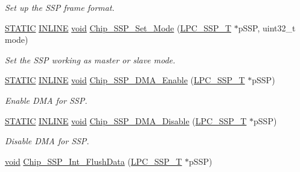 \begin{DoxyCompactItemize}
\begin{DoxyCompactList}\small\item\em Set up the S\-S\-P frame format. \end{DoxyCompactList}\item 
\hyperlink{group__LPC__Types__Public__Macros_ga10b2d890d871e1489bb02b7e70d9bdfb}{S\-T\-A\-T\-I\-C} \hyperlink{group__LPC__Types__Public__Types_ga2eb6f9e0395b47b8d5e3eeae4fe0c116}{I\-N\-L\-I\-N\-E} \hyperlink{Paradigm_2Tern__EE_2small_2portmacro_8h_a14d32f8130d3c0b212cfc751730b5b49}{void} \hyperlink{group__SSP__17XX__40XX_ga9b5a23b5030facdb75c3ed06d5e86172}{Chip\-\_\-\-S\-S\-P\-\_\-\-Set\-\_\-\-Mode} (\hyperlink{structLPC__SSP__T}{L\-P\-C\-\_\-\-S\-S\-P\-\_\-\-T} $\ast$p\-S\-S\-P, uint32\-\_\-t mode)
\begin{DoxyCompactList}\small\item\em Set the S\-S\-P working as master or slave mode. \end{DoxyCompactList}\item 
\hyperlink{group__LPC__Types__Public__Macros_ga10b2d890d871e1489bb02b7e70d9bdfb}{S\-T\-A\-T\-I\-C} \hyperlink{group__LPC__Types__Public__Types_ga2eb6f9e0395b47b8d5e3eeae4fe0c116}{I\-N\-L\-I\-N\-E} \hyperlink{Paradigm_2Tern__EE_2small_2portmacro_8h_a14d32f8130d3c0b212cfc751730b5b49}{void} \hyperlink{group__SSP__17XX__40XX_gae8bf34541c093c052e5f9baf41fcda8b}{Chip\-\_\-\-S\-S\-P\-\_\-\-D\-M\-A\-\_\-\-Enable} (\hyperlink{structLPC__SSP__T}{L\-P\-C\-\_\-\-S\-S\-P\-\_\-\-T} $\ast$p\-S\-S\-P)
\begin{DoxyCompactList}\small\item\em Enable D\-M\-A for S\-S\-P. \end{DoxyCompactList}\item 
\hyperlink{group__LPC__Types__Public__Macros_ga10b2d890d871e1489bb02b7e70d9bdfb}{S\-T\-A\-T\-I\-C} \hyperlink{group__LPC__Types__Public__Types_ga2eb6f9e0395b47b8d5e3eeae4fe0c116}{I\-N\-L\-I\-N\-E} \hyperlink{Paradigm_2Tern__EE_2small_2portmacro_8h_a14d32f8130d3c0b212cfc751730b5b49}{void} \hyperlink{group__SSP__17XX__40XX_gaa8c7ce019dfcc4ab5731615f66c30e19}{Chip\-\_\-\-S\-S\-P\-\_\-\-D\-M\-A\-\_\-\-Disable} (\hyperlink{structLPC__SSP__T}{L\-P\-C\-\_\-\-S\-S\-P\-\_\-\-T} $\ast$p\-S\-S\-P)
\begin{DoxyCompactList}\small\item\em Disable D\-M\-A for S\-S\-P. \end{DoxyCompactList}\item 
\hyperlink{Paradigm_2Tern__EE_2small_2portmacro_8h_a14d32f8130d3c0b212cfc751730b5b49}{void} \hyperlink{group__SSP__17XX__40XX_gabf29dfba7478866abe7511d32638e57e}{Chip\-\_\-\-S\-S\-P\-\_\-\-Int\-\_\-\-Flush\-Data} (\hyperlink{structLPC__SSP__T}{L\-P\-C\-\_\-\-S\-S\-P\-\_\-\-T} $\ast$p\-S\-S\-P)

\end{DoxyCompactItemize}
